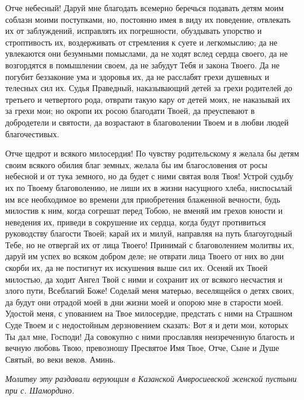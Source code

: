 \shortpage[3]{}

Отче небесный! Даруй мне благодать всемерно беречься подавать детям моим соблазн моими поступками, но, постоянно имея в виду их поведение, отвлекать их от заблуждений, исправлять их погрешности, обуздывать упорство и строптивость их, воздерживать от стремления к суете и легкомыслию; да не увлекаются они безумными помыслами, да не ходят вслед сердца своего, да не возгордятся в помышлении своем, да не забудут Тебя и закона Твоего. Да не погубит беззаконие ума и здоровья их, да не расслабят грехи душевных и телесных сил их. Судья Праведный, наказывающий детей за грехи родителей до третьего и четвертого рода, отврати такую кару от детей моих, не наказывай их за грехи мои; но окропи их росою благодати Твоей, да преуспевают в добродетели и святости, да возрастают в благоволении Твоем и в любви людей благочестивых.


Отче щедрот и всякого милосердия! По чувству родительскому я желала бы детям своим всякого обилия благ земных, желала бы им благословения от росы небесной и от тука земного, но да будет с ними святая воля Твоя! Устрой судьбу их по Твоему благоволению, не лиши их в жизни насущного хлеба, ниспосылай им все необходимое во времени для приобретения блаженной вечности, будь милостив к ним, когда согрешат перед Тобою, не вменяй им грехов юности и неведения их, приведи в сокрушение их сердца, когда будут противиться руководству благости Твоей; карай их и милуй, направляя на путь благоугодный Тебе, но не отвергай их от лица Твоего! Принимай с благоволением молитвы их, даруй им успех во всяком добром деле; не отврати лица Твоего от них во дни скорби их, да не постигнут их искушения выше сил их. Осеняй их Твоей милостью, да ходит Ангел Твой с ними и сохранит их от всякого несчастия и злого пути, Всеблагий Боже! Соделай меня матерью, веселящейся о детях своих, да будут они отрадой моей в дни жизни моей и опорою мне в старости моей. Удостой меня, с упованием на Твое милосердие, предстать с ними на Страшном Суде Твоем и с недостойным дерзновением сказать: Вот я и дети мои, которых Ты дал мне, Господи! Да совокупно с ними прославляя неизреченную благость и вечную любовь Твою, превозношу Пресвятое Имя Твое, Отче, Сыне и Душе Святый, во веки веков. Аминь.

\itshape Молитву эту раздавали верующим в Казанской Амвросиевской женской пустыни при с. Шамордино.

\normalfont{}





